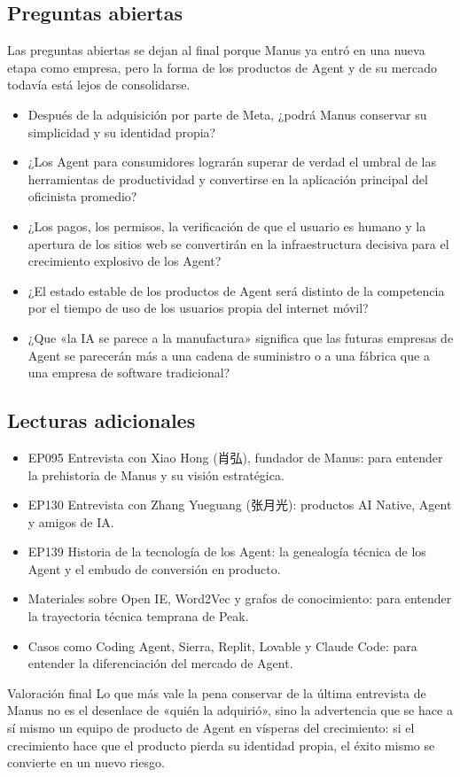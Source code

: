 \documentclass[a4paper]{article}
\begin{document}
\subsection{Preguntas abiertas}

Las preguntas abiertas se dejan al final porque Manus ya entró en una nueva etapa como empresa, pero la forma de los productos de Agent y de su mercado todavía está lejos de consolidarse.

\begin{itemize}
\item Después de la adquisición por parte de Meta, ¿podrá Manus conservar su simplicidad y su identidad propia?
\item ¿Los Agent para consumidores lograrán superar de verdad el umbral de las herramientas de productividad y convertirse en la aplicación principal del oficinista promedio?
\item ¿Los pagos, los permisos, la verificación de que el usuario es humano y la apertura de los sitios web se convertirán en la infraestructura decisiva para el crecimiento explosivo de los Agent?
\item ¿El estado estable de los productos de Agent será distinto de la competencia por el tiempo de uso de los usuarios propia del internet móvil?
\item ¿Que «la IA se parece a la manufactura» significa que las futuras empresas de Agent se parecerán más a una cadena de suministro o a una fábrica que a una empresa de software tradicional?
\end{itemize}

\subsection{Lecturas adicionales}

\begin{itemize}
\item EP095 Entrevista con Xiao Hong (肖弘), fundador de Manus: para entender la prehistoria de Manus y su visión estratégica.
\item EP130 Entrevista con Zhang Yueguang (张月光): productos AI Native, Agent y amigos de IA.
\item EP139 Historia de la tecnología de los Agent: la genealogía técnica de los Agent y el embudo de conversión en producto.
\item Materiales sobre Open IE, Word2Vec y grafos de conocimiento: para entender la trayectoria técnica temprana de Peak.
\item Casos como Coding Agent, Sierra, Replit, Lovable y Claude Code: para entender la diferenciación del mercado de Agent.
\end{itemize}

\begin{importantbox}{Valoración final}
Lo que más vale la pena conservar de la última entrevista de Manus no es el desenlace de «quién la adquirió», sino la advertencia que se hace a sí mismo un equipo de producto de Agent en vísperas del crecimiento: si el crecimiento hace que el producto pierda su identidad propia, el éxito mismo se convierte en un nuevo riesgo.
\end{importantbox}
\end{document}
